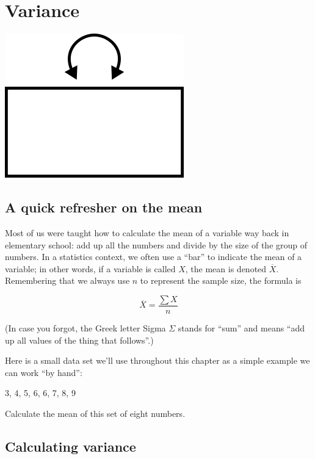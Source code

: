 \documentclass[
]{book}
\begin{document}
\hypertarget{variance}{%
\chapter{Variance}\label{variance}}

\begin{center}\includegraphics{graphics/variance} \end{center}

\hypertarget{variance-mean}{%
\section{A quick refresher on the mean}\label{variance-mean}}

Most of us were taught how to calculate the mean of a variable way back in elementary school: add up all the numbers and divide by the size of the group of numbers. In a statistics context, we often use a ``bar'' to indicate the mean of a variable; in other words, if a variable is called \(X\), the mean is denoted \(\overline{X}\). Remembering that we always use \(n\) to represent the sample size, the formula is

\[
\overline{X} = \frac{\sum{X}}{n}
\]

(In case you forgot, the Greek letter Sigma \(\Sigma\) stands for ``sum'' and means ``add up all values of the thing that follows''.)

Here is a small data set we'll use throughout this chapter as a simple example we can work ``by hand'':

3, 4, 5, 6, 6, 7, 8, 9

Calculate the mean of this set of eight numbers.

\hypertarget{variance-calculating}{%
\section{Calculating variance}\label{variance-calculating}}
\end{document}
